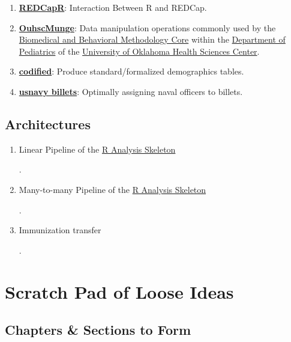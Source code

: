 \documentclass[]{book}
\providecommand{\tightlist}{%
  \setlength{\itemsep}{0pt}\setlength{\parskip}{0pt}}
\begin{document}
\begin{enumerate}
\def\labelenumi{\arabic{enumi}.}
\tightlist
\item
  \textbf{\href{https://ouhscbbmc.github.io/REDCapR/}{REDCapR}}: Interaction Between R and REDCap.
\item
  \textbf{\href{https://ouhscbbmc.github.io/OuhscMunge/}{OuhscMunge}}: Data manipulation operations commonly used by the \href{http://www.ouhsc.edu/bbmc/}{Biomedical and Behavioral Methodology Core} within the \href{http://www.oumedicine.com/pediatrics}{Department of Pediatrics} of the \href{http://ouhsc.edu/}{University of Oklahoma Health Sciences Center}.
\item
  \textbf{\href{https://ouhscbbmc.github.io/codified/}{codified}}: Produce standard/formalized demographics tables.
\item
  \textbf{\href{https://github.com/OuhscBbmc/usnavy-billets}{usnavy billets}}: Optimally assigning naval officers to billets.
\end{enumerate}

\hypertarget{architectures}{%
\section{Architectures}\label{architectures}}

\begin{enumerate}
\def\labelenumi{\arabic{enumi}.}
\item
  Linear Pipeline of the \href{https://github.com/wibeasley/RAnalysisSkeleton}{R Analysis Skeleton}

  .
\item
  Many-to-many Pipeline of the \href{https://github.com/wibeasley/RAnalysisSkeleton}{R Analysis Skeleton}

  .
\item
  Immunization transfer

  .
\end{enumerate}

\hypertarget{scratch-pad}{%
\chapter{Scratch Pad of Loose Ideas}\label{scratch-pad}}

\hypertarget{chapters-sections-to-form}{%
\section{Chapters \& Sections to Form}\label{chapters-sections-to-form}}
\end{document}
